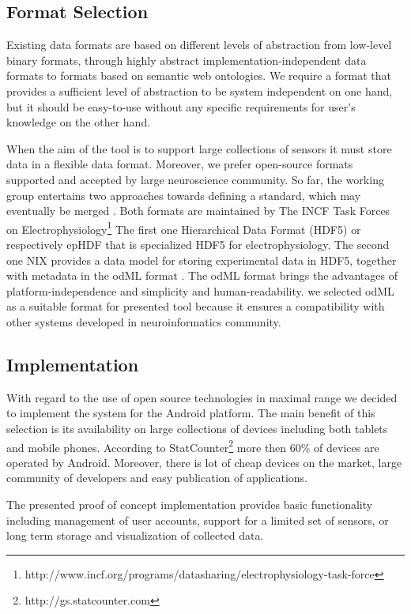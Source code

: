 \documentclass[a4paper,twoside]{article}
\begin{document}
\subsection{Format Selection}

Existing data formats are based on different levels of abstraction from low-level binary formats, through highly abstract implementation-independent data formats to formats based on semantic web ontologies. We require a format that provides a sufficient level of abstraction to be system independent on one hand, but it should be easy-to-use without any specific requirements for user's knowledge on the other hand.

When the aim of the tool is to support large collections of sensors it must store data in a flexible data format. Moreover, we prefer open-source formats supported and accepted by large neuroscience community. So far, the working group entertains two approaches towards defining a standard, which may eventually be merged \cite{10.3389/conf.fninf.2013.09.00069}. Both formats are maintained by The INCF Task Forces on Electrophysiology\footnote{http://www.incf.org/programs/datasharing/electrophysiology-task-force} The first one Hierarchical Data Format (HDF5) \cite{hdf5} or respectively epHDF that is specialized HDF5 for electrophysiology. The second one NIX \cite{Stoewer:2014}  provides a data model for storing experimental data in HDF5, together with metadata in the odML format \cite{10.3389/fninf.2011.00016}. The odML format brings the advantages of platform-independence and simplicity and human-readability.  we selected odML as a suitable format for presented tool because it ensures a compatibility with other systems developed in neuroinformatics community.

\subsection{Implementation}

With regard to the use of open source technologies in maximal range we decided to implement the system for the Android platform. The main benefit of this selection is its availability on large collections of devices including both tablets and mobile phones. According to StatCounter\footnote{http://gs.statcounter.com} more then 60\% of devices are operated by Android.   Moreover, there is lot of cheap devices on the market, large community of developers and easy publication of applications. 

The presented proof of concept implementation provides basic functionality including management of user accounts,  support for a limited set of sensors, or long term storage and visualization of collected data.
\end{document}
